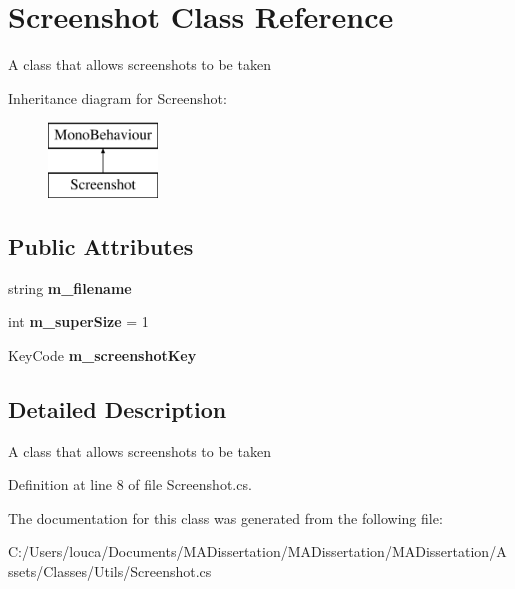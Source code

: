 \hypertarget{class_screenshot}{}\section{Screenshot Class Reference}
\label{class_screenshot}


A class that allows screenshots to be taken  


Inheritance diagram for Screenshot\+:\begin{figure}[H]
\begin{center}
\leavevmode
\includegraphics[height=2.000000cm]{class_screenshot}
\end{center}
\end{figure}
\subsection*{Public Attributes}
\begin{DoxyCompactItemize}
\item 
\mbox{\label{class_screenshot_a21c1f3172a2ddda552690a011bc94ec8}} 
string {\bfseries m\+\_\+filename}
\item 
\mbox{\label{class_screenshot_a9abe9d95f9a5e9a70be2f02ab546fc06}} 
int {\bfseries m\+\_\+super\+Size} = 1
\item 
\mbox{\label{class_screenshot_a3c00ae9816a0b25218639edbe5a2c9df}} 
Key\+Code {\bfseries m\+\_\+screenshot\+Key}
\end{DoxyCompactItemize}


\subsection{Detailed Description}
A class that allows screenshots to be taken 



Definition at line 8 of file Screenshot.\+cs.



The documentation for this class was generated from the following file\+:\begin{DoxyCompactItemize}
\item 
C\+:/\+Users/louca/\+Documents/\+M\+A\+Dissertation/\+M\+A\+Dissertation/\+M\+A\+Dissertation/\+Assets/\+Classes/\+Utils/Screenshot.\+cs\end{DoxyCompactItemize}
